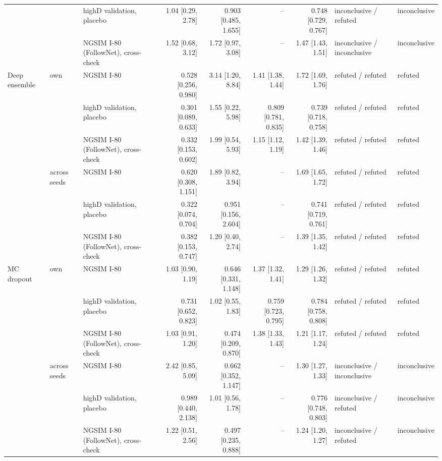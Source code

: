 \begin{table}[htbp]
\begin{tabular}{lllrrrrll}
 &  & highD validation, placebo & 1.04 [0.29, 2.78] & 0.903 [0.485, 1.655] & -- & 0.748 [0.729, 0.767] & inconclusive / refuted & inconclusive \\
 &  & NGSIM I-80 (FollowNet), cross-check & 1.52 [0.68, 3.12] & 1.72 [0.97, 3.08] & -- & 1.47 [1.43, 1.51] & inconclusive / inconclusive & inconclusive \\
\midrule
Deep ensemble & own & NGSIM I-80 & 0.528 [0.256, 0.980] & 3.14 [1.20, 8.84] & 1.41 [1.38, 1.44] & 1.72 [1.69, 1.76] & refuted / refuted & refuted \\
 &  & highD validation, placebo & 0.301 [0.089, 0.633] & 1.55 [0.22, 5.98] & 0.809 [0.781, 0.835] & 0.739 [0.718, 0.758] & refuted / refuted & refuted \\
 &  & NGSIM I-80 (FollowNet), cross-check & 0.332 [0.153, 0.602] & 1.99 [0.54, 5.93] & 1.15 [1.12, 1.19] & 1.42 [1.39, 1.46] & refuted / refuted & refuted \\
\midrule
 & across seeds & NGSIM I-80 & 0.620 [0.308, 1.151] & 1.89 [0.82, 3.94] & -- & 1.69 [1.65, 1.72] & refuted / refuted & refuted \\
 &  & highD validation, placebo & 0.322 [0.074, 0.704] & 0.951 [0.156, 2.604] & -- & 0.741 [0.719, 0.761] & refuted / refuted & refuted \\
 &  & NGSIM I-80 (FollowNet), cross-check & 0.382 [0.153, 0.747] & 1.20 [0.40, 2.74] & -- & 1.39 [1.35, 1.42] & refuted / refuted & refuted \\
\midrule
MC dropout & own & NGSIM I-80 & 1.03 [0.90, 1.19] & 0.646 [0.331, 1.148] & 1.37 [1.32, 1.41] & 1.29 [1.26, 1.32] & refuted / refuted & refuted \\
 &  & highD validation, placebo & 0.731 [0.652, 0.823] & 1.02 [0.55, 1.83] & 0.759 [0.723, 0.795] & 0.784 [0.758, 0.808] & refuted / refuted & refuted \\
 &  & NGSIM I-80 (FollowNet), cross-check & 1.03 [0.91, 1.20] & 0.474 [0.209, 0.870] & 1.38 [1.33, 1.43] & 1.21 [1.17, 1.24] & refuted / refuted & refuted \\
\midrule
 & across seeds & NGSIM I-80 & 2.42 [0.85, 5.09] & 0.662 [0.352, 1.147] & -- & 1.30 [1.27, 1.33] & inconclusive / inconclusive & inconclusive \\
 &  & highD validation, placebo & 0.989 [0.440, 2.138] & 1.01 [0.56, 1.78] & -- & 0.776 [0.748, 0.803] & inconclusive / refuted & inconclusive \\
 &  & NGSIM I-80 (FollowNet), cross-check & 1.22 [0.51, 2.56] & 0.497 [0.235, 0.888] & -- & 1.24 [1.20, 1.27] & inconclusive / refuted & inconclusive \\

\end{tabular}
\end{table}
